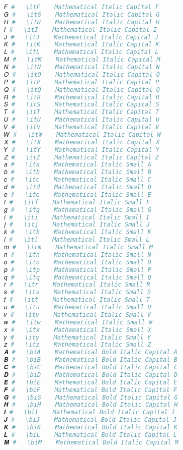 \begin{lstlisting}[language=Julia, style=julia]
𝐹 #   \itF    Mathematical Italic Capital F
𝐺 #   \itG    Mathematical Italic Capital G
𝐻 #   \itH    Mathematical Italic Capital H
𝐼 #   \itI    Mathematical Italic Capital I
𝐽 #   \itJ    Mathematical Italic Capital J
𝐾 #   \itK    Mathematical Italic Capital K
𝐿 #   \itL    Mathematical Italic Capital L
𝑀 #   \itM    Mathematical Italic Capital M
𝑁 #   \itN    Mathematical Italic Capital N
𝑂 #   \itO    Mathematical Italic Capital O
𝑃 #   \itP    Mathematical Italic Capital P
𝑄 #   \itQ    Mathematical Italic Capital Q
𝑅 #   \itR    Mathematical Italic Capital R
𝑆 #   \itS    Mathematical Italic Capital S
𝑇 #   \itT    Mathematical Italic Capital T
𝑈 #   \itU    Mathematical Italic Capital U
𝑉 #   \itV    Mathematical Italic Capital V
𝑊 #   \itW    Mathematical Italic Capital W
𝑋 #   \itX    Mathematical Italic Capital X
𝑌 #   \itY    Mathematical Italic Capital Y
𝑍 #   \itZ    Mathematical Italic Capital Z
𝑎 #   \ita    Mathematical Italic Small A
𝑏 #   \itb    Mathematical Italic Small B
𝑐 #   \itc    Mathematical Italic Small C
𝑑 #   \itd    Mathematical Italic Small D
𝑒 #   \ite    Mathematical Italic Small E
𝑓 #   \itf    Mathematical Italic Small F
𝑔 #   \itg    Mathematical Italic Small G
𝑖 #   \iti    Mathematical Italic Small I
𝑗 #   \itj    Mathematical Italic Small J
𝑘 #   \itk    Mathematical Italic Small K
𝑙 #   \itl    Mathematical Italic Small L
𝑚 #   \itm    Mathematical Italic Small M
𝑛 #   \itn    Mathematical Italic Small N
𝑜 #   \ito    Mathematical Italic Small O
𝑝 #   \itp    Mathematical Italic Small P
𝑞 #   \itq    Mathematical Italic Small Q
𝑟 #   \itr    Mathematical Italic Small R
𝑠 #   \its    Mathematical Italic Small S
𝑡 #   \itt    Mathematical Italic Small T
𝑢 #   \itu    Mathematical Italic Small U
𝑣 #   \itv    Mathematical Italic Small V
𝑤 #   \itw    Mathematical Italic Small W
𝑥 #   \itx    Mathematical Italic Small X
𝑦 #   \ity    Mathematical Italic Small Y
𝑧 #   \itz    Mathematical Italic Small Z
𝑨 #   \biA    Mathematical Bold Italic Capital A
𝑩 #   \biB    Mathematical Bold Italic Capital B
𝑪 #   \biC    Mathematical Bold Italic Capital C
𝑫 #   \biD    Mathematical Bold Italic Capital D
𝑬 #   \biE    Mathematical Bold Italic Capital E
𝑭 #   \biF    Mathematical Bold Italic Capital F
𝑮 #   \biG    Mathematical Bold Italic Capital G
𝑯 #   \biH    Mathematical Bold Italic Capital H
𝑰 #   \biI    Mathematical Bold Italic Capital I
𝑱 #   \biJ    Mathematical Bold Italic Capital J
𝑲 #   \biK    Mathematical Bold Italic Capital K
𝑳 #   \biL    Mathematical Bold Italic Capital L
𝑴 #   \biM    Mathematical Bold Italic Capital M

\end{lstlisting}

